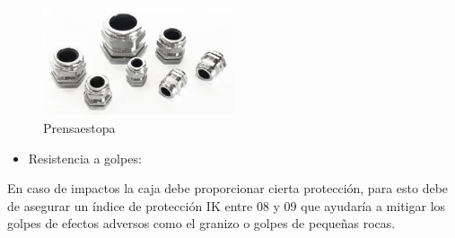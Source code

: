 \begin{figure}[H]
    \centering
    \includegraphics[width=0.5\textwidth]{images/4-DesarrolloTeorico/4-1-caja/CAJA_PRENSAESTOPAS.png}
    \caption{Prensaestopa}
    \label{fig:DesarrolloTeorico/Caja/CAJA_PRENSAESTOPA}
\end{figure}


\begin{itemize}
    \item Resistencia a golpes:
\end{itemize}

En caso de impactos la caja debe proporcionar cierta protección, para esto debe de asegurar un índice de protección IK entre 08 y 09 que ayudaría a mitigar los golpes de efectos adversos como el granizo o golpes de pequeñas rocas.
